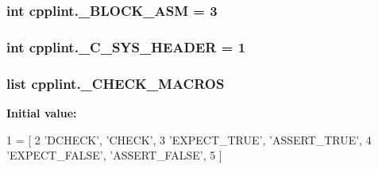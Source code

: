 \subsubsection[{\texorpdfstring{\+\_\+\+B\+L\+O\+C\+K\+\_\+\+A\+SM}{_BLOCK_ASM}}]{\setlength{\rightskip}{0pt plus 5cm}int cpplint.\+\_\+\+B\+L\+O\+C\+K\+\_\+\+A\+SM = 3\hspace{0.3cm}{\ttfamily [private]}}\hypertarget{namespacecpplint_a0f1f8da647bf9ced22d7834e1d27d065}{}\label{namespacecpplint_a0f1f8da647bf9ced22d7834e1d27d065}
\subsubsection[{\texorpdfstring{\+\_\+\+C\+\_\+\+S\+Y\+S\+\_\+\+H\+E\+A\+D\+ER}{_C_SYS_HEADER}}]{\setlength{\rightskip}{0pt plus 5cm}int cpplint.\+\_\+\+C\+\_\+\+S\+Y\+S\+\_\+\+H\+E\+A\+D\+ER = 1\hspace{0.3cm}{\ttfamily [private]}}\hypertarget{namespacecpplint_a845e252934563f3b8dbab7cbbd81929d}{}\label{namespacecpplint_a845e252934563f3b8dbab7cbbd81929d}
\subsubsection[{\texorpdfstring{\+\_\+\+C\+H\+E\+C\+K\+\_\+\+M\+A\+C\+R\+OS}{_CHECK_MACROS}}]{\setlength{\rightskip}{0pt plus 5cm}list cpplint.\+\_\+\+C\+H\+E\+C\+K\+\_\+\+M\+A\+C\+R\+OS\hspace{0.3cm}{\ttfamily [private]}}\hypertarget{namespacecpplint_a96865866cf9b608cbe21c0549782e33c}{}\label{namespacecpplint_a96865866cf9b608cbe21c0549782e33c}
{\bfseries Initial value\+:}
\begin{DoxyCode}
1 = [
2     \textcolor{stringliteral}{'DCHECK'}, \textcolor{stringliteral}{'CHECK'},
3     \textcolor{stringliteral}{'EXPECT\_TRUE'}, \textcolor{stringliteral}{'ASSERT\_TRUE'},
4     \textcolor{stringliteral}{'EXPECT\_FALSE'}, \textcolor{stringliteral}{'ASSERT\_FALSE'},
5     ]
\end{DoxyCode}
